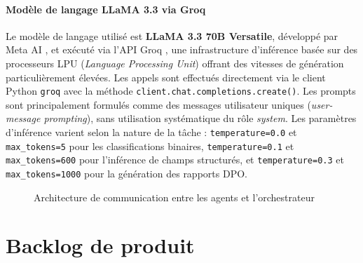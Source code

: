 \documentclass[12pt,a4paper]{report}
\begin{document}
\paragraph{Modèle de langage LLaMA 3.3 via Groq}

Le modèle de langage utilisé est \textbf{LLaMA 3.3 70B Versatile}, développé par Meta AI \cite{meta_llama}, et exécuté via l'API Groq \cite{groq_doc}, une infrastructure d'inférence basée sur des processeurs LPU (\textit{Language Processing Unit}) offrant des vitesses de génération particulièrement élevées. Les appels sont effectués directement via le client Python \texttt{groq} avec la méthode \texttt{client.chat.completions.create()}. Les prompts sont principalement formulés comme des messages utilisateur uniques (\textit{user-message prompting}), sans utilisation systématique du rôle \textit{system}. Les paramètres d'inférence varient selon la nature de la tâche : \texttt{temperature=0.0} et \texttt{max\_tokens=5} pour les classifications binaires, \texttt{temperature=0.1} et \texttt{max\_tokens=600} pour l'inférence de champs structurés, et \texttt{temperature=0.3} et \texttt{max\_tokens=1000} pour la génération des rapports DPO.

\begin{figure}[H]
\centering
{}
\caption{Architecture de communication entre les agents et l'orchestrateur}
\label{fig:architecture_agents}
\end{figure}

\section{Backlog de produit}
\end{document}

